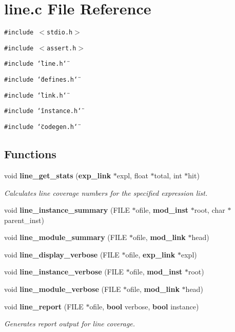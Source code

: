\section{line.c File Reference}
\label{line_8c}
{\tt \#include $<$stdio.h$>$}\par
{\tt \#include $<$assert.h$>$}\par
{\tt \#include \char`\"{}line.h\char`\"{}}\par
{\tt \#include \char`\"{}defines.h\char`\"{}}\par
{\tt \#include \char`\"{}link.h\char`\"{}}\par
{\tt \#include \char`\"{}instance.h\char`\"{}}\par
{\tt \#include \char`\"{}codegen.h\char`\"{}}\par
\subsection*{Functions}
\begin{CompactItemize}
\item 
void {\bf line\_\-get\_\-stats} ({\bf exp\_\-link} $\ast$expl, float $\ast$total, int $\ast$hit)
\begin{CompactList}\small\item\em Calculates line coverage numbers for the specified expression list.\item\end{CompactList}\item 
void {\bf line\_\-instance\_\-summary} (FILE $\ast$ofile, {\bf mod\_\-inst} $\ast$root, char $\ast$parent\_\-inst)
\item 
void {\bf line\_\-module\_\-summary} (FILE $\ast$ofile, {\bf mod\_\-link} $\ast$head)
\item 
void {\bf line\_\-display\_\-verbose} (FILE $\ast$ofile, {\bf exp\_\-link} $\ast$expl)
\item 
void {\bf line\_\-instance\_\-verbose} (FILE $\ast$ofile, {\bf mod\_\-inst} $\ast$root)
\item 
void {\bf line\_\-module\_\-verbose} (FILE $\ast$ofile, {\bf mod\_\-link} $\ast$head)
\item 
void {\bf line\_\-report} (FILE $\ast$ofile, {\bf bool} verbose, {\bf bool} instance)
\begin{CompactList}\small\item\em Generates report output for line coverage.\item\end{CompactList}\end{CompactItemize}
